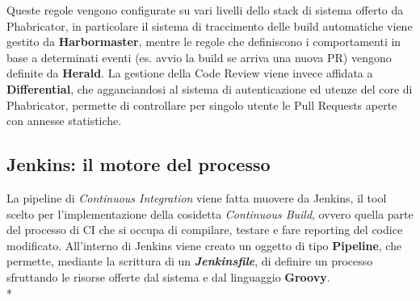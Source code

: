 \documentclass[../main.tex]{subfiles}
\begin{document}
        	    Queste regole vengono configurate su vari livelli dello stack di sistema offerto da Phabricator, in particolare il sistema di traccimento delle build automatiche viene gestito da \textbf{Harbormaster}, mentre le regole che definiscono i comportamenti in base a determinati eventi (es. avvio la build se arriva una nuova PR) vengono definite da \textbf{Herald}. La gestione della Code Review viene invece affidata a \textbf{Differential}, che agganciandosi al sistema di autenticazione ed utenze del core di Phabricator, permette di controllare per singolo utente le Pull Requests aperte con annesse statistiche.
        	
        	\subsection{Jenkins: il motore del processo}
        	
        	    La pipeline di \emph{Continuous Integration} viene fatta muovere da Jenkins, il tool scelto per l'implementazione della cosidetta \emph{Continuous Build}, ovvero quella parte del processo di CI che si occupa di compilare, testare e fare reporting del codice modificato. All'interno di Jenkins viene creato un oggetto di tipo \textbf{Pipeline}, che permette, mediante la scrittura di un \textbf{\emph{Jenkinsfile}}, di definire un processo sfruttando le risorse offerte dal sistema e dal linguaggio \textbf{Groovy}.\\*
        	    
\end{document}

